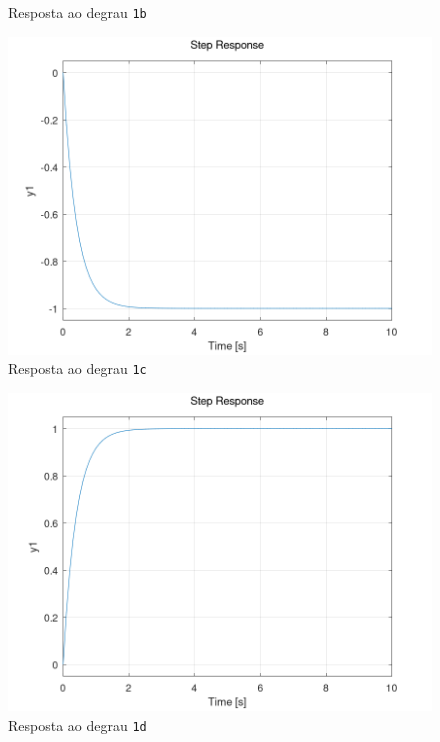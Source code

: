 \documentclass[a4paper,12pt]{article}
\begin{document}
\begin{enumerate}
\begin{figure}[htbp]
            \caption{Resposta ao degrau \texttt{1b}}
            \label{fig1b}
        \end{figure}
        \begin{figure}[htbp]
            \centering
            \includegraphics[scale=0.4]{../fig/fig1c.png}
            \caption{Resposta ao degrau \texttt{1c}}
            \label{fig1c}
        \end{figure}
        \begin{figure}[htbp]
            \centering
            \includegraphics[scale=0.4]{../fig/fig1d.png}
            \caption{Resposta ao degrau \texttt{1d}}
            \label{fig1d}
        \end{figure}
        \begin{figure}[htbp]

\end{figure}
\end{enumerate}
\end{document}
